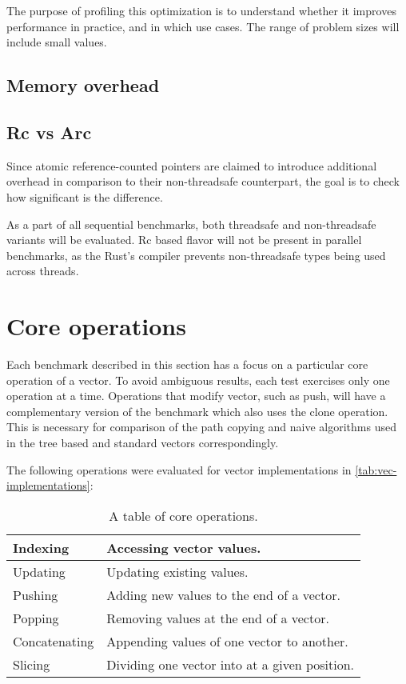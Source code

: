 The purpose of profiling this optimization is to understand whether it improves performance in practice, and in which use cases. The range of problem sizes will include small values. 


\subsection{Memory overhead}

\subsection{Rc vs Arc}
Since atomic reference-counted pointers are claimed to introduce additional overhead in comparison to their non-threadsafe counterpart, the goal is to check how significant is the difference. 

As a part of all sequential benchmarks, both threadsafe and non-threadsafe variants will be evaluated. Rc based flavor will not be present in parallel benchmarks, as the Rust's compiler prevents non-threadsafe types being used across threads. 

\section{Core operations}
Each benchmark described in this section has a focus on a particular core operation of a vector. To avoid ambiguous results, each test exercises only one operation at a time. Operations that modify vector, such as push, will have a complementary version of the benchmark which also uses the clone operation. This is necessary for comparison of the path copying and naive algorithms used in the tree based and standard vectors correspondingly. 

The following operations were evaluated for vector implementations in \ref{tab:vec-implementations}:

\begin{table}[!htbp]
    \centering

    \begin{tabular} { |l| p{10cm} | }
        \hline 
        Indexing & Accessing vector values. \\ \hline
        Updating & Updating existing values. \\ \hline
        Pushing & Adding new values to the end of a vector. \\ \hline
        Popping & Removing values at the end of a vector. \\ \hline
        Concatenating & Appending values of one vector to another. \\ \hline
        Slicing & Dividing one vector into at a given position. \\ \hline        
    \end{tabular}
    
    \label{tab:vec-core-operations}
    \caption{A table of core operations.}
\end{table}

